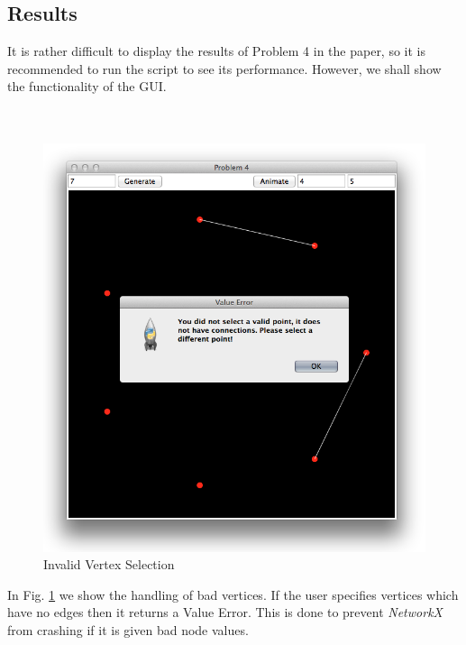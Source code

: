 \subsection{Results} %
\label{sub:results4}
It is rather difficult to display the results of Problem 4 in the paper, so it is recommended to run the script to see its performance. However, we shall show the functionality of the GUI.\\\\\\
\begin{figure}[H]
    \centering
        \includegraphics[width=4.75in,trim=1in .6in 1in 1in]{include/prob4invalid.png}
    \caption{Invalid Vertex Selection}
    \label{fig:include_prob4invalid}
\end{figure}
In Fig. \ref{fig:include_prob4invalid} we show the handling of bad vertices. If the user specifies vertices which have no edges then it returns a Value Error. This is done to prevent \emph{NetworkX} from crashing if it is given bad node values.

